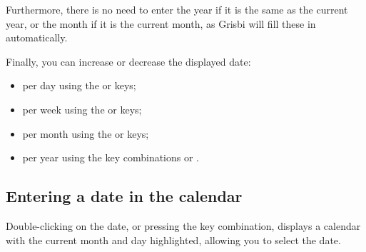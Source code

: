 Furthermore, there is no need to enter the year if it is the same as the current year, or the month if it is the current month, as Grisbi will fill these in automatically.

Finally, you can increase or decrease the displayed date:

\begin{itemize}
	\item per day using the \keys{{+}} or \keys{{-}} keys;
	\item per week using the  or  keys;
	\item per month using the  or  keys;
	\item per year using the key combinations  or .
\end{itemize}


\subsection{Entering a date in the calendar\label{transactions-new-calendar}}

Double-clicking on the date, or pressing the  key combination, displays a calendar with the current month and day highlighted, allowing you to select the date.

